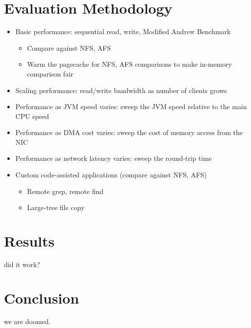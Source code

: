 \documentclass[10pt]{article}
\begin{document}
\section{Evaluation Methodology}

\begin{itemize}
\item Basic performance: sequential read, write, Modified Andrew
  Benchmark
\begin{itemize}
\item Compare against NFS, AFS
\item Warm the pagecache for NFS, AFS comparisons to make in-memory
  comparison fair
\end{itemize}
\item Scaling performance: read/write bandwidth as number of clients grows
\item Performance as JVM speed varies: sweep the JVM speed relative to
  the main CPU speed
\item Performance as DMA cost varies: sweep the cost of memory access
  from the NIC
\item Performance as network latency varies: sweep the round-trip time
\item Custom code-assisted applications (compare against NFS, AFS)
\begin{itemize}
\item Remote grep, remote find
\item Large-tree file copy
\end{itemize}
\end{itemize}

\section{Results}
did it work?

\section{Conclusion}
we are doomed.


 
\end{document}

